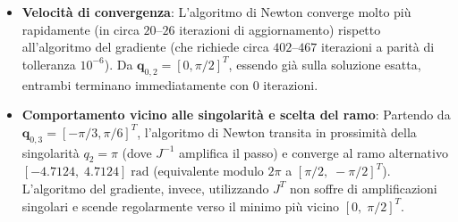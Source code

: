 \documentclass[11pt, a4paper]{article}
\begin{document}
\begin{itemize}
   \item{\begin{flushleft} \textbf{Velocità di convergenza}: L'algoritmo di Newton converge molto più rapidamente (in circa $20\text{--}26$ iterazioni di aggiornamento) rispetto all'algoritmo del gradiente (che richiede circa $402\text{--}467$ iterazioni a parità di tolleranza $10^{-6}$). Da $\mathbf{q}_{0,2}=[0,\pi/2]^T$, essendo già sulla soluzione esatta, entrambi terminano immediatamente con $0$ iterazioni. \end{flushleft}}
   \item{\begin{flushleft} \textbf{Comportamento vicino alle singolarità e scelta del ramo}: Partendo da $\mathbf{q}_{0,3}=[-\pi/3,\pi/6]^T$, l'algoritmo di Newton transita in prossimità della singolarità $q_2=\pi$ (dove $J^{-1}$ amplifica il passo) e converge al ramo alternativo $[-4.7124,\; 4.7124]\;\mathrm{rad}$ (equivalente modulo $2\pi$ a $[\pi/2,\;-\pi/2]^T$). L'algoritmo del gradiente, invece, utilizzando $J^T$ non soffre di amplificazioni singolari e scende regolarmente verso il minimo più vicino $[0,\;\pi/2]^T$. \end{flushleft}}
\end{itemize}
\end{document}
